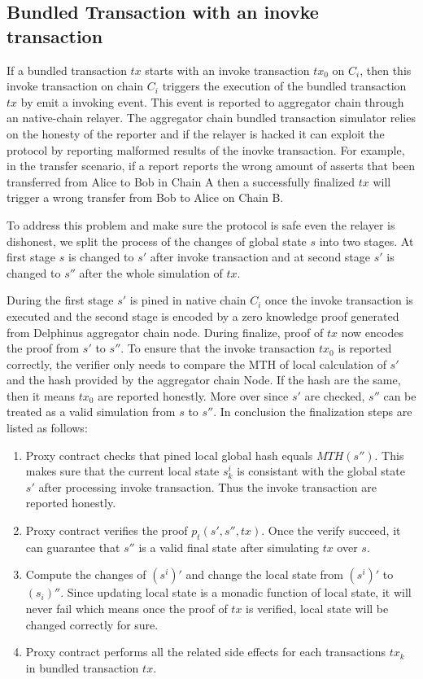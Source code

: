 \documentclass[acmtog, natbib=false]{acmart}
\begin{document}
\subsection{Bundled Transaction with an inovke transaction}
If a bundled transaction $tx$ starts with an invoke transaction $tx_0$ on $C_i$, then this invoke transaction on chain $C_i$ triggers the execution of the bundled transaction $tx$ by emit a invoking event. This event is reported to aggregator chain through an native-chain relayer. The aggregator chain bundled transaction simulator relies on the honesty of the reporter and if the relayer is hacked it can exploit the protocol by reporting malformed results of the inovke transaction. For example, in the transfer scenario, if a report reports the wrong amount of asserts that been transferred from Alice to Bob in Chain A then a successfully finalized $tx$ will trigger a wrong transfer from Bob to Alice on Chain B.

To address this problem and make sure the protocol is safe even the relayer is dishonest, we split the process of the changes of global state $s$ into two stages. At first stage $s$ is changed to $s'$ after invoke transaction and at second stage $s'$ is changed to $s''$ after the whole simulation of $tx$.

During the first stage $s'$ is pined in native chain $C_i$ once the invoke transaction is executed and the second stage is encoded by a zero knowledge proof generated from Delphinus aggregator chain  node. During finalize, proof of $tx$ now encodes the proof from $s'$ to $s''$. To ensure that the invoke transaction $tx_0$ is reported correctly, the verifier only needs to compare the MTH of local calculation of $s'$ and the hash provided by the aggregator chain Node. If the hash are the same, then it means $tx_0$ are reported honestly. More over since $s'$ are checked, $s''$ can be treated as a valid simulation from $s$ to $s''$. In conclusion the finalization steps are listed as follows:

\begin{enumerate}[leftmargin=*]
\item Proxy contract checks that pined local global hash equals $MTH(s'')$. This makes sure that the current local state $s_k^i$ is consistant with the global state $s'$ after processing invoke transaction. Thus the invoke transaction are reported honestly.

\item Proxy contract verifies the proof $p_{t}(s', s'', tx)$. Once the verify succeed, it can guarantee that $s''$ is a valid final state after simulating $tx$ over $s$.

\item Compute the changes of $(s^i)'$ and change the local state from $(s^i)'$ to $(s_i)''$. Since updating local state is a monadic function of local state, it will never fail which means once the proof of $tx$ is verified, local state will be changed correctly for sure.

\item Proxy contract performs all the related side effects for each transactions $tx_k$ in bundled transaction $tx$. 
\end{enumerate}
\end{document}
